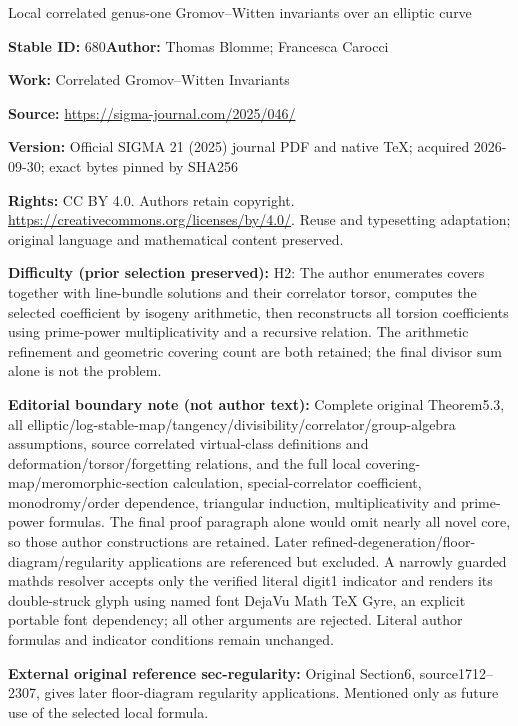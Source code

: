 \documentclass[11pt]{article}
\numberwithin{equation}{section}
\numberwithin{equation}{section}
\theoremstyle{definition}
\begin{document}
\begin{center}\Large Local correlated genus-one Gromov–Witten invariants over an elliptic curve\end{center}
\noindent\textbf{Stable ID:} 680\quad\textbf{Author:} Thomas Blomme; Francesca Carocci\par
\noindent\textbf{Work:} Correlated Gromov–Witten Invariants\par
\noindent\textbf{Source:} \url{https://sigma-journal.com/2025/046/}\par
\noindent\textbf{Version:} Official SIGMA 21 (2025) journal PDF and native TeX; acquired 2026-09-30; exact bytes pinned by SHA256\par
\noindent\textbf{Rights:} CC BY 4.0. Authors retain copyright. \url{https://creativecommons.org/licenses/by/4.0/}. Reuse and typesetting adaptation; original language and mathematical content preserved.\par
\noindent\textbf{Difficulty (prior selection preserved):} {\CJKfont H2: The author enumerates covers together with line-bundle solutions and their correlator torsor, computes the selected coefficient by isogeny arithmetic, then reconstructs all torsion coefficients using prime-power multiplicativity and a recursive relation. The arithmetic refinement and geometric covering count are both retained; the final divisor sum alone is not the problem.}\par
\medskip\noindent\textbf{Editorial boundary note (not author text):} Complete original Theorem5.3, all elliptic/log-stable-map/tangency/divisibility/correlator/group-algebra assumptions, source correlated virtual-class definitions and deformation/torsor/forgetting relations, and the full local covering-map/meromorphic-section calculation, special-correlator coefficient, monodromy/order dependence, triangular induction, multiplicativity and prime-power formulas. The final proof paragraph alone would omit nearly all novel core, so those author constructions are retained. Later refined-degeneration/floor-diagram/regularity applications are referenced but excluded. A narrowly guarded mathds resolver accepts only the verified literal digit1 indicator and renders its double-struck glyph using named font DejaVu Math TeX Gyre, an explicit portable font dependency; all other arguments are rejected. Literal author formulas and indicator conditions remain unchanged.\par
\noindent\textbf{External original reference sec-regularity:} Original Section6, source1712–2307, gives later floor-diagram regularity applications. Mentioned only as future use of the selected local formula.\par
\end{document}

